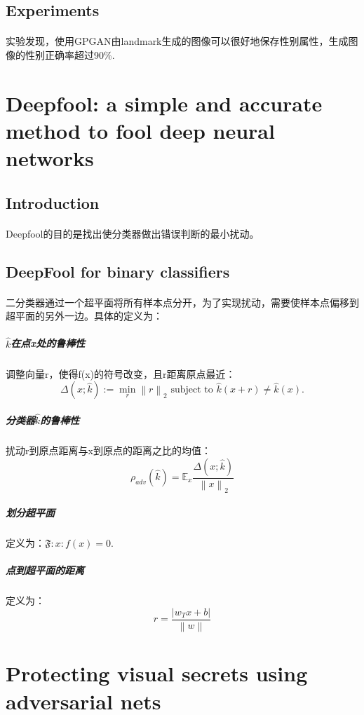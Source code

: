 \documentclass[12pt,a4paper]{article}
\begin{document}
\subsection{Experiments}
\paragraph{} 实验发现，使用GPGAN由landmark生成的图像可以很好地保存性别属性，生成图像的性别正确率超过90\%.

\section{Deepfool: a simple and accurate method to fool deep neural networks\cite{deepfool}}
\subsection{Introduction}
\paragraph{} Deepfool的目的是找出使分类器做出错误判断的最小扰动。
\subsection{DeepFool for binary classifiers}
\paragraph{} 二分类器通过一个超平面将所有样本点分开，为了实现扰动，需要使样本点偏移到超平面的另外一边。具体的定义为：
\subparagraph{$\hat k$在点x处的鲁棒性} 调整向量r，使得f(x)的符号改变，且r距离原点最近：
\begin{equation}
	\Delta(x;\hat k) := \min_r \left \| r \right \|_2 \mbox{ subject to } \hat k(x+r)\neq \hat k(x).
\end{equation}
\subparagraph{分类器$\hat k$的鲁棒性} 扰动r到原点距离与x到原点的距离之比的均值：
\begin{equation}
	\rho_{adv}(\hat k) = \mathbb{E}_x\frac{\Delta(x;\hat k)}{\left \| x \right \|_2}
\end{equation}
\subparagraph{划分超平面} 定义为：$\mathfrak{F}: {x:f(x)=0}$.
\subparagraph{点到超平面的距离\cite{2016机器学习}} 定义为：
\begin{equation}
	r = \frac{|w_Tx+b|}{\left \| w \right \|}
\end{equation}

\section{Protecting visual secrets using adversarial nets\cite{raval2017protecting}}
\end{document}
